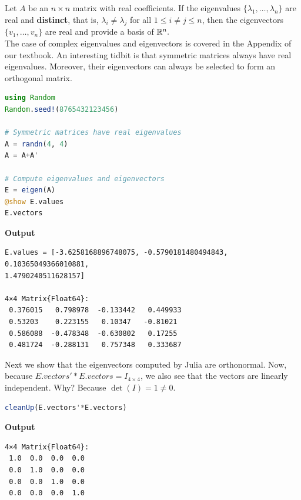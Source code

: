 \begin{tcolorbox}[sharp corners, colback=green!30, colframe=green!80!blue, title=\textbf{\Large When the Eigenvalues are Real and Distinct, the Eigenvectors form a Basis of $\real^n$}]
Let $A$ be an $n \times n$ matrix with real coefficients. If the eigenvalues $\{ \lambda_1,\ldots, \lambda_n \}$ are real and \textbf{distinct}, that is, $\lambda_i \neq \lambda_j $ for all $1 \le i \neq j \le n$, then the eigenvectors $\{ v_1,\ldots,v_n \}$ are real and provide a basis of $\mathbb R^n.$\\

The case of complex eigenvalues and eigenvectors is covered in the Appendix of our textbook. An interesting tidbit is that symmetric matrices always have real eigenvalues. Moreover, their eigenvectors can always be selected to form an orthogonal matrix.
\end{tcolorbox}

\begin{lstlisting}[language=Julia,style=mystyle]
using Random
Random.seed!(8765432123456)

# Symmetric matrices have real eigenvalues
A = randn(4, 4)
A = A+A'

# Compute eigenvalues and eigenvectors
E = eigen(A)
@show E.values
E.vectors
\end{lstlisting}
\textbf{Output} 
\begin{verbatim}
E.values = [-3.6258168896748075, -0.5790181480494843, 0.10365049366010881,
1.4790240511628157]

4×4 Matrix{Float64}:
 0.376015   0.798978  -0.133442   0.449933
 0.53203    0.223155   0.10347   -0.81021
 0.586088  -0.478348  -0.630802   0.17255
 0.481724  -0.288131   0.757348   0.333687
\end{verbatim}

Next we show that the eigenvectors computed by Julia are orthonormal. Now, because $E.vectors'*E.vectors = I_{4 \times 4}$, we also see that the vectors are linearly independent. Why? Because $\det(I)=1 \neq 0$.\\

\begin{lstlisting}[language=Julia,style=mystyle]
cleanUp(E.vectors'*E.vectors)
\end{lstlisting}
\textbf{Output} 
\begin{verbatim}
4×4 Matrix{Float64}:
 1.0  0.0  0.0  0.0
 0.0  1.0  0.0  0.0
 0.0  0.0  1.0  0.0
 0.0  0.0  0.0  1.0
\end{verbatim}

